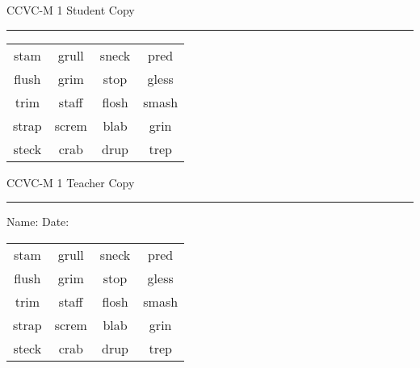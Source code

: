 \documentclass{memoir}
\begin{document}

\footnotesize \noindent
CCVC-M 1 \hfill Student Copy
\smallskip
\hrule

\Large

\setlength{\tabcolsep}{14pt}
\def\arraystretch{3}

{\selectfont


\begin{vplace}[0.5]
\begin{center}
\begin{tabular}{cccc}
stam            & grull            & sneck & pred \\
flush & grim       & stop & gless \\
trim & staff            & flosh & smash \\
strap & screm & blab             & grin     \\
steck & crab        & drup & trep \\
\end{tabular}
\end{center}
\end{vplace}

}

\newpage

\footnotesize \noindent
CCVC-M 1 \hfill Teacher Copy
\smallskip
\hrule

\small

\vfill

\noindent
Name: \underline{\hspace{1.75in}} \hfill Date: \underline{\hspace{1in}}

\Large

{\selectfont


\begin{vplace}[0.5]
\begin{center}
\begin{tabular}{cccc}
stam            & grull            & sneck & pred \\
flush & grim       & stop & gless \\
trim & staff            & flosh & smash \\
strap & screm & blab             & grin     \\
steck & crab        & drup & trep \\
\end{tabular}
\end{center}
\end{vplace}



}
\end{document}
